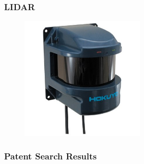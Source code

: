 \documentclass{beamer}
\begin{document}
\begin{frame}
  \frametitle{LIDAR}
  \begin{figure}
    \centering
    \includegraphics[width=6cm]{laser.jpg}
  \end{figure}
\end{frame}

\begin{frame}
  \frametitle{Patent Search Results}
\end{frame}
\end{document}
